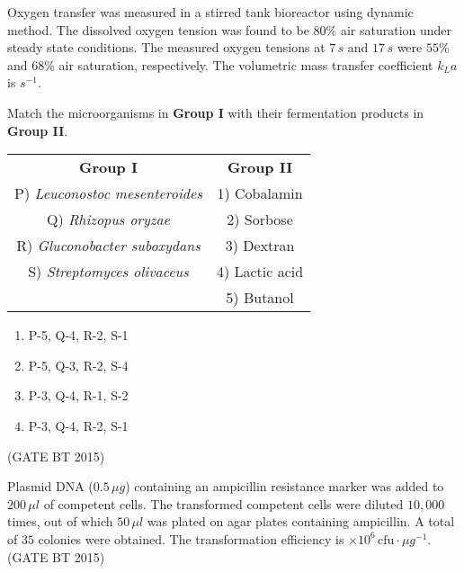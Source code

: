 \item Oxygen transfer was measured in a stirred tank bioreactor using dynamic method. The dissolved oxygen tension was found to be $80\%$ air saturation under steady state conditions. The measured oxygen tensions at $7 \, s$ and $17 \, s$ were $55\%$ and $68\%$ air saturation, respectively. The volumetric mass transfer coefficient $k_{L}a$ is \underline{\hspace{2cm}} $s^{-1}$.

\item Match the microorganisms in \textbf{Group I} with their fermentation products in \textbf{Group II}.  

\begin{table}[H]
\begin{tabular}{cc}
\textbf{Group I} & \textbf{Group II} \\
P) \textit{Leuconostoc mesenteroides}   & 1) Cobalamin \\
Q) \textit{Rhizopus oryzae}             & 2) Sorbose \\
R) \textit{Gluconobacter suboxydans}    & 3) Dextran \\
S) \textit{Streptomyces olivaceus}      & 4) Lactic acid \\
                                        & 5) Butanol \\
\end{tabular}
\end{table}

\begin{multicols}{2}
\begin{enumerate}
    \item P-5, Q-4, R-2, S-1
    \item P-5, Q-3, R-2, S-4
    \item P-3, Q-4, R-1, S-2
    \item P-3, Q-4, R-2, S-1
\end{enumerate}
\end{multicols}\hfill (GATE BT 2015)

\item Plasmid DNA ($0.5 \, \mu g$) containing an ampicillin resistance marker was added to $200 \, \mu l$ of competent cells. The transformed competent cells were diluted $10{,}000$ times, out of which $50 \, \mu l$ was plated on agar plates containing ampicillin. A total of $35$ colonies were obtained. The transformation efficiency is \underline{\hspace{2cm}} $\times 10^{6} \, \text{cfu} \cdot \mu g^{-1}$.
\hfill (GATE BT 2015)



